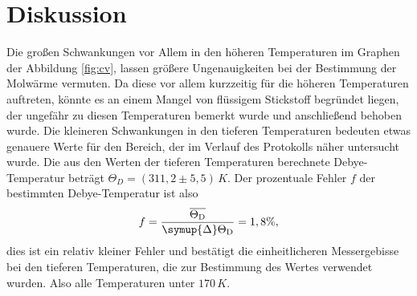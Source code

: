 \section{Diskussion}
\label{sec:Diskussion}


Die großen Schwankungen vor Allem in den höheren Temperaturen im Graphen der Abbildung \ref{fig:cv},
lassen größere Ungenauigkeiten bei der Bestimmung der Molwärme vermuten. Da diese vor allem kurzzeitig 
für die höheren Temperaturen auftreten, könnte es an einem Mangel von flüssigem Stickstoff begründet liegen, 
der ungefähr zu diesen Temperaturen bemerkt wurde und anschließend behoben wurde. Die kleineren 
Schwankungen in den tieferen Temperaturen bedeuten etwas genauere Werte für den Bereich, der 
im Verlauf des Protokolls näher untersucht wurde. Die aus den Werten der tieferen Temperaturen 
berechnete Debye-Temperatur beträgt $\Theta_{\si{D}}=(311,2 \pm 5,5) \, \si{K}$. Der prozentuale Fehler $f$ der bestimmten 
Debye-Temperatur ist also
\begin{equation*}
    f = \frac{\overline{\Theta_{\si{D}}}}{\symup{\Delta}\Theta_{\si{D}}} = 1,8 \%,
\end{equation*}
dies ist ein relativ kleiner Fehler und bestätigt die einheitlicheren Messergebisse bei den tieferen Temperaturen, 
die zur Bestimmung des Wertes verwendet wurden. Also alle Temperaturen unter $170 \, \si{K}$.

